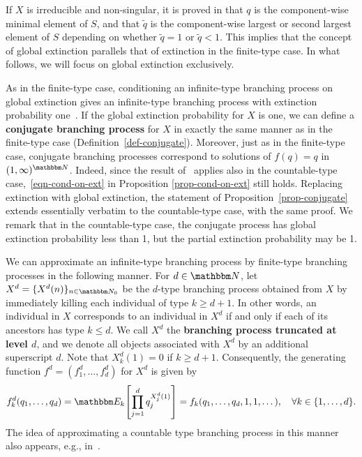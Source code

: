 \documentclass[11pt]{article}
\theoremstyle{plain}
\theoremstyle{definition}
\numberwithin{equation}{section}
\newcommand{\eqb}{\begin{equation}}
\newcommand{\eqe}{\end{equation}}
\newcommand{\BB}{\mathbbm}
\let\originalleft\left
\let\originalright\right
\renewcommand{\left}{\mathopen{}\mathclose\bgroup\originalleft}
\renewcommand{\right}{\aftergroup\egroup\originalright}
\begin{document}
If $X$ is  irreducible and non-singular, it is proved in \cite[Theorem 3.1]{Moyal1964} that $q$ is the component-wise minimal element of $S$, and \cite[Theorem 3.1]{Bertacchi2022} that $\tilde{q}$ is the component-wise largest or second largest element of $S$ depending on whether $\tilde{q}=1$ or $\tilde{q}<1$. This implies that the concept of global extinction parallels that of extinction in the finite-type case. In what follows, we will focus on global extinction exclusively.

As in the finite-type case, conditioning an infinite-type branching process on global extinction gives an infinite-type branching process with extinction probability one~\cite{jl-cond-on-ext}. If the global extinction probability for $X$ is one, we can define a \textbf{conjugate branching process} for $X$ in exactly the same manner as in the finite-type case (Definition~\ref{def-conjugate}). Moreover, just as in the finite-type case, conjugate branching processes correspond to solutions of $f(q) =q$ in $(1,\infty)^{\BB N}$. Indeed, since the result of~\cite{jl-cond-on-ext} applies also in the countable-type case,~\eqref{eqn-cond-on-ext} in Proposition \ref{prop-cond-on-ext} still holds. Replacing extinction with global extinction, the statement of Proposition~\ref{prop-conjugate} extends essentially verbatim to the countable-type case, with the same proof. We remark that in the countable-type case, the conjugate process has global extinction probability less than 1, but the partial extinction probability may be 1. 
 
We can approximate an infinite-type branching process by finite-type branching processes in the following manner.  
For $d\in \BB N$, let $X^d = \{X^d(n)\}_{n\in\BB N_0}$ be the $d$-type branching process obtained from $X$ by immediately killing each individual of type $k \geq d+1$. In other words, an individual in $X$ corresponds to an individual in $X^d$ if and only if each of its ancestors has type $k \leq d$. We call $X^d$ the \textbf{branching process truncated at level $d$}, and we denote all objects associated with $X^d$ by an additional superscript $d$. Note that $X^d_k(1)=0$ if $k \geq d+1$.
Consequently, the generating function $f^d = (f_1^d,\dots,f_d^d)$ for $X^d$ is given by
\eqb  \label{eqn-gf-truncated}
f^d_k(q_1,\dots,q_d) 
= \BB E_k\left[ \prod_{j=1}^d q_j^{X_j^d(1)} \right] 
= f_k(q_1,\dots,q_d,1,1,\dots)
,\quad\forall k \in \{1,\dots,d\} .
\eqe 
The idea of approximating a countable type branching process in this manner also appears, e.g., in~\cite{hln-ext-prob}.
 
\end{document}
